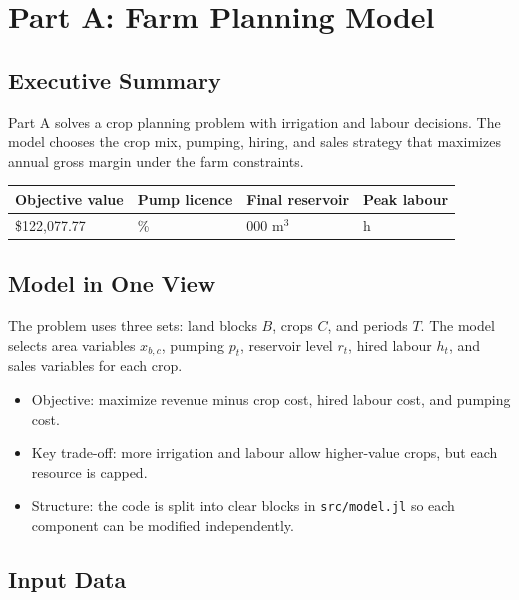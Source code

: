 \section{Part A: Farm Planning Model}

\subsection{Executive Summary}

Part A solves a crop planning problem with irrigation and labour decisions. The model chooses the crop mix, pumping, hiring, and sales strategy that maximizes annual gross margin under the farm constraints.

\begin{center}
\small
\renewcommand{\arraystretch}{1.18}
\begin{tabular}{>{\raggedright\arraybackslash}p{} >{\centering\arraybackslash}p{} >{\centering\arraybackslash}p{} >{\centering\arraybackslash}p{}}
\toprule
\textbf{Objective value} & \textbf{Pump licence} & \textbf{Final reservoir} & \textbf{Peak labour} \\
\midrule
\$122{,}077.77 & 100\% & 10{,}000 m$^3$ & 125 h \\
\bottomrule
\end{tabular}
\end{center}

\subsection{Model in One View}

The problem uses three sets: land blocks $B$, crops $C$, and periods $T$. The model selects area variables $x_{b,c}$, pumping $p_t$, reservoir level $r_t$, hired labour $h_t$, and sales variables for each crop.

\begin{itemize}[leftmargin=1.5em]
    \item Objective: maximize revenue minus crop cost, hired labour cost, and pumping cost.
    \item Key trade-off: more irrigation and labour allow higher-value crops, but each resource is capped.
    \item Structure: the code is split into clear blocks in \texttt{src/model.jl} so each component can be modified independently.
\end{itemize}

\subsection{Input Data}


